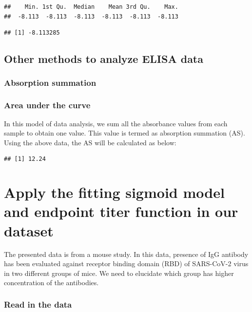 \documentclass[
]{book}
\begin{document}
\begin{verbatim}
##    Min. 1st Qu.  Median    Mean 3rd Qu.    Max. 
##  -8.113  -8.113  -8.113  -8.113  -8.113  -8.113
\end{verbatim}

\begin{verbatim}
## [1] -8.113285
\end{verbatim}

\hypertarget{other-methods-to-analyze-elisa-data}{%
\subsection{Other methods to analyze ELISA data}\label{other-methods-to-analyze-elisa-data}}

\hypertarget{absorption-summation}{%
\subsubsection{Absorption summation}\label{absorption-summation}}

\hypertarget{area-under-the-curve}{%
\subsubsection{Area under the curve}\label{area-under-the-curve}}

In this model of data analysis, we sum all the absorbance values from each sample to obtain one value. This value is termed as absorption summation (AS). Using the above data, the AS will be calculated as below:

\begin{verbatim}
## [1] 12.24
\end{verbatim}

\hypertarget{apply-the-fitting-sigmoid-model-and-endpoint-titer-function-in-our-dataset}{%
\section{Apply the fitting sigmoid model and endpoint titer function in our dataset}\label{apply-the-fitting-sigmoid-model-and-endpoint-titer-function-in-our-dataset}}

The presented data is from a mouse study. In this data, presence of IgG antibody has been evaluated against receptor binding domain (RBD) of SARS-CoV-2 virus in two different groups of mice. We need to elucidate which group has higher concentration of the antibodies.

\hypertarget{read-in-the-data-1}{%
\subsubsection{Read in the data}\label{read-in-the-data-1}}
\end{document}
